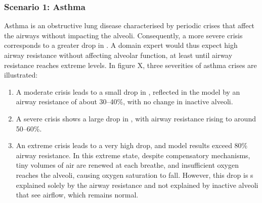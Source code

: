 

\subsubsection{Scenario 1: Asthma}
Asthma is an obstructive lung disease characterised by periodic crises that affect the airways without impacting the alveoli. Consequently, a more severe crisis corresponds to a greater drop in \F. A domain expert would thus expect high airway resistance without affecting alveolar function, at least until airway resistance reaches extreme levels. In figure X, three severities of asthma crises are illustrated:
\begin{enumerate}
    \item A moderate crisis leads to a small drop in \F, reflected in the model by an airway resistance of about 30–40\%, with no change in inactive alveoli.
    \item A severe crisis shows a large drop in \F, with airway resistance rising to around 50–60\%.
    \item An extreme crisis leads to a very high \F drop, and model results exceed 80\% airway resistance. In this extreme state, despite compensatory mechanisms, tiny volumes of air are renewed at each breathe, and insufficient oxygen reaches the alveoli, causing oxygen saturation to fall. However, this drop is s explained solely by the airway resistance and not explained by inactive alveoli that see airflow, which remains normal.
\end{enumerate}

